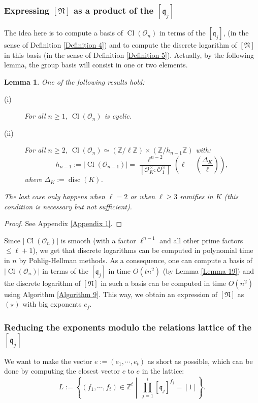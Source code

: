 \documentclass[a4paper,10pt,notitlepage]{report}
\theoremstyle{definition}
\theoremstyle{plain}
\newtheorem{Lemma}[Definition]{Lemma}
\theoremstyle{definition}
\newcommand{\Z}{\mathbb{Z}}
\newcommand{\mO}{\mathcal{O}}
\renewcommand{\(}{\left(}
\renewcommand{\)}{\right)}
\newcommand{\mf}[1]{\mathfrak{#1}}
\DeclareMathOperator{\disc}{disc}
\DeclareMathOperator{\Cl}{Cl}
\begin{document}
\subsubsection{Expressing $[\mf{N}]$ as a product of the $[\mf{q}_j]$}

The idea here is to compute a basis of $\Cl(\mO_n)$ in terms of the $[\mf{q}_j]$, (in the sense of Definition \ref{Definition 4}) and to compute the discrete logarithm of $[\mf{N}]$ in this basis (in the sense of Definition \ref{Definition 5}). Actually, by the following lemma, the group basis will consist in one or two elements.

\begin{Lemma}\label{Lemma 20}
One of the following results hold:

\begin{description}
\item[(i)] For all $n\geq 1$, $\Cl(\mO_n)$ is cyclic.
\item[(ii)] For all $n\geq 2$, $\Cl(\mO_n)\simeq (\Z/\ell\Z)\times(\Z/h_{n-1}\Z)$ with:
\[h_{n-1}:=|\Cl(\mO_{n-1})|=\frac{\ell^{n-2}}{[\mO_K^\times:\mO_1^\times]}\(\ell-\(\frac{\Delta_K}{\ell}\)\),\]
where $\Delta_K:=\disc(K)$.
\end{description}
The last case only happens when $\ell=2$ or when $\ell\geq 3$ ramifies in $K$ (this condition is necessary but not sufficient). 
\end{Lemma} 

\begin{proof}
See Appendix \ref{Appendix 1}.
\end{proof}

Since $|\Cl(\mO_n)|$ is smooth (with a factor $\ell^{n-1}$ and all other prime factors $\leq \ell+1$), we get that discrete logarithms can be computed in polynomial time in $n$ by Pohlig-Hellman methods. As a consequence, one can compute a basis of $|\Cl(\mO_n)|$ in terms of the $[\mf{q}_j]$ in time $O(tn^2)$ (by Lemma \ref{Lemma 19}) and the discrete logarithm of $[\mf{N}]$ in such a basis can be computed in time $O(n^2)$ using Algorithm \ref{Algorithm 9}. This way, we obtain an expression of $[\mf{N}]$ as $(\star)$ with big exponents $e_j$.


\subsubsection{Reducing the exponents modulo the relations lattice of the $[\mf{q}_j]$}\label{Paragraph 16}

We want to make the vector $e:=(e_1, \cdots, e_t)$ as short as possible, which can be done by computing the closest vector $c$ to $e$ in the lattice:
\[L:=\left\{(f_1,\cdots,f_{t})\in\Z^{t} \middle| \  \prod_{j=1}^t[\mf{q}_j]^{f_j}=[1]\right\}.\]
\end{document}
